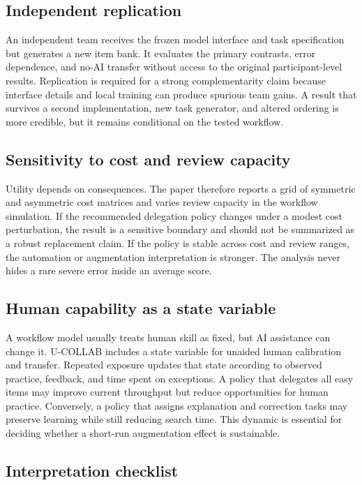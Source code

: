 \documentclass[conference]{IEEEtran}
\begin{document}
\subsection{Independent replication}

An independent team receives the frozen model interface and task specification but generates a new item bank. It evaluates the primary contrasts, error dependence, and no-AI transfer without access to the original participant-level results. Replication is required for a strong complementarity claim because interface details and local training can produce spurious team gains. A result that survives a second implementation, new task generator, and altered ordering is more credible, but it remains conditional on the tested workflow.

\subsection{Sensitivity to cost and review capacity}

Utility depends on consequences. The paper therefore reports a grid of symmetric and asymmetric cost matrices and varies review capacity in the workflow simulation. If the recommended delegation policy changes under a modest cost perturbation, the result is a sensitive boundary and should not be summarized as a robust replacement claim. If the policy is stable across cost and review ranges, the automation or augmentation interpretation is stronger. The analysis never hides a rare severe error inside an average score.

\subsection{Human capability as a state variable}

A workflow model usually treats human skill as fixed, but AI assistance can change it. U-COLLAB includes a state variable for unaided human calibration and transfer. Repeated exposure updates that state according to observed practice, feedback, and time spent on exceptions. A policy that delegates all easy items may improve current throughput but reduce opportunities for human practice. Conversely, a policy that assigns explanation and correction tasks may preserve learning while still reducing search time. This dynamic is essential for deciding whether a short-run augmentation effect is sustainable.

\subsection{Interpretation checklist}
\end{document}
